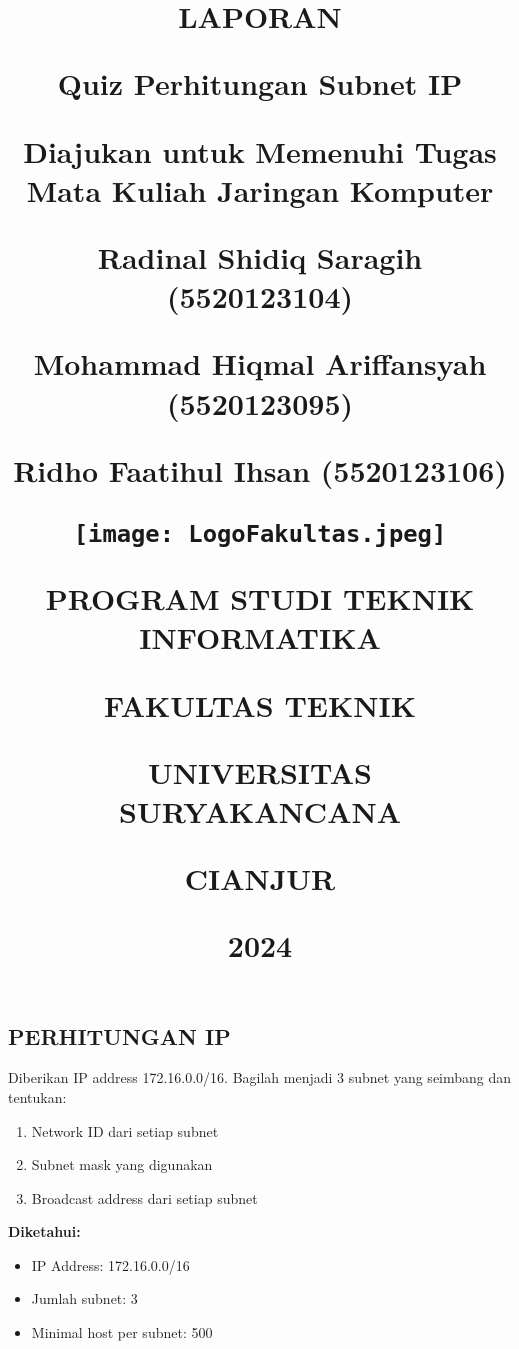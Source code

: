 \documentclass[12pt, a4paper]{article}
\date{}
\title{

  \LARGE{\textbf{LAPORAN}}

  {\vspace{1cm}}

  \large{\textbf{Quiz Perhitungan Subnet IP}}

  {\large{Diajukan untuk Memenuhi Tugas Mata Kuliah Jaringan Komputer}}

  {\vspace{2cm}}

  \normalsize{Radinal Shidiq Saragih (5520123104)}

  \normalsize{Mohammad Hiqmal Ariffansyah (5520123095)}

  \normalsize{Ridho Faatihul Ihsan (5520123106)}

  {\vspace{2cm}}

  {\texttt{[image: LogoFakultas.jpeg]}}

  {\vspace{3cm}}

  {\large{PROGRAM STUDI TEKNIK INFORMATIKA}}

  {\large{FAKULTAS TEKNIK}}

  {\large{UNIVERSITAS SURYAKANCANA}}

  {\large{CIANJUR}}

  {\small{2024}}
}
\begin{document}
\maketitle

\newpage

\begin{center}
  \section*{PERHITUNGAN IP}
\end{center}

\vspace{1cm}

Diberikan IP address 172.16.0.0/16. Bagilah menjadi 3 subnet yang seimbang dan tentukan:

\begin{enumerate}
    \item Network ID dari setiap subnet
    \item Subnet mask yang digunakan
    \item Broadcast address dari setiap subnet
\end{enumerate}

\textbf{Diketahui:}
\begin{itemize}
    \item IP Address: 172.16.0.0/16
    \item Jumlah subnet: 3
    \item Minimal host per subnet: 500
\end{itemize}
\end{document}

